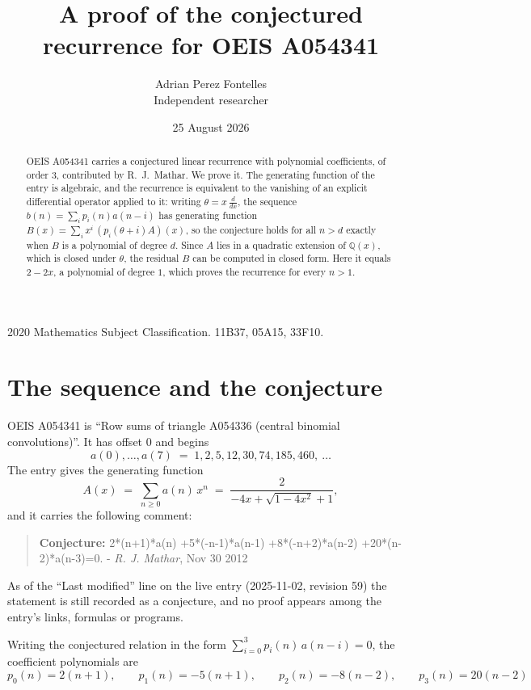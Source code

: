 \documentclass[11pt,a4paper]{article}
\title{A proof of the conjectured recurrence for OEIS A054341}
\author{Adrian Perez Fontelles\\ \small Independent researcher}
\date{25 August 2026}
\theoremstyle{plain}
\theoremstyle{definition}
\begin{document}
\maketitle

\begin{abstract}
OEIS A054341 carries a conjectured linear recurrence with polynomial coefficients, of
order 3, contributed by R.~J.~Mathar. We prove it. The generating function of the
entry is algebraic, and the recurrence is equivalent to the vanishing of an explicit
differential operator applied to it: writing $\theta=x\,\frac{d}{dx}$, the sequence
$b(n)=\sum_{i}p_{i}(n)a(n-i)$ has generating function
$B(x)=\sum_{i}x^{i}\,(p_{i}(\theta+i)A)(x)$, so the conjecture holds for all $n>d$ exactly
when $B$ is a polynomial of degree $d$. Since $A$ lies in a quadratic extension of
$\mathbb{Q}(x)$, which is closed under $\theta$, the residual $B$ can be computed in
closed form. Here it equals $2 - 2 x$, a polynomial of degree $1$, which proves
the recurrence for every $n>1$.
\end{abstract}

\noindent\small 2020 Mathematics Subject Classification. 11B37, 05A15, 33F10.\normalsize

\section{The sequence and the conjecture}

OEIS A054341 is ``Row sums of triangle A054336 (central binomial convolutions)''. It has offset $0$ and begins
\[
a(0),\dots,a(7)\;=\;1, 2, 5, 12, 30, 74, 185, 460,\ \dots
\]
The entry gives the generating function
\begin{equation}\label{eq:gf}
A(x)\;=\;\sum_{n\ge 0} a(n)\,x^{n}\;=\;\frac{2}{- 4 x + \sqrt{1 - 4 x^{2}} + 1} ,
\end{equation}
and it carries the following comment:
\begin{quote}\small
\textbf{Conjecture:} 2*(n+1)*a(n) +5*(-n-1)*a(n-1) +8*(-n+2)*a(n-2) +20*(n-2)*a(n-3)=0. - \emph{R. J. Mathar}, Nov 30 2012
\end{quote}
As of the ``Last modified'' line on the live entry (2025-11-02, revision 59) the
statement is still recorded as a conjecture, and no proof appears among the entry's links,
formulas or programs.

Writing the conjectured relation in the form $\sum_{i=0}^{3}p_{i}(n)\,a(n-i)=0$,
the coefficient polynomials are
\[
p_{0}(n)=2 \left(n + 1\right),\qquad p_{1}(n)=- 5 \left(n + 1\right),\qquad p_{2}(n)=- 8 \left(n - 2\right),\qquad p_{3}(n)=20 \left(n - 2\right)
\]
\end{document}
